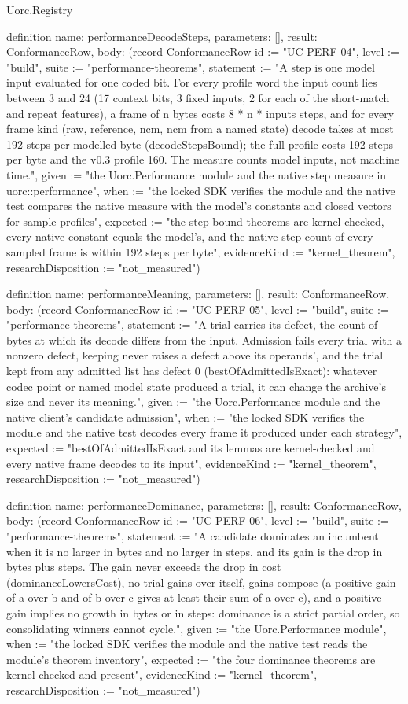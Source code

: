 \begin{lexlean}{Uorc.Registry}
\begin{semanticmodule}
definition{
  name: performanceDecodeSteps,
  parameters: [],
  result: ConformanceRow,
  body: (record ConformanceRow {id := "UC-PERF-04", level := "build", suite := "performance-theorems", statement := "A step is one model input evaluated for one coded bit. For every profile word the input count lies between 3 and 24 (17 context bits, 3 fixed inputs, 2 for each of the short-match and repeat features), a frame of n bytes costs 8 * n * inputs steps, and for every frame kind (raw, reference, ncm, ncm from a named state) decode takes at most 192 steps per modelled byte (decodeStepsBound); the full profile costs 192 steps per byte and the v0.3 profile 160. The measure counts model inputs, not machine time.", given := "the Uorc.Performance module and the native step measure in uorc::performance", when := "the locked SDK verifies the module and the native test compares the native measure with the model's constants and closed vectors for sample profiles", expected := "the step bound theorems are kernel-checked, every native constant equals the model's, and the native step count of every sampled frame is within 192 steps per byte", evidenceKind := "kernel_theorem", researchDisposition := "not_measured"})
}

definition{
  name: performanceMeaning,
  parameters: [],
  result: ConformanceRow,
  body: (record ConformanceRow {id := "UC-PERF-05", level := "build", suite := "performance-theorems", statement := "A trial carries its defect, the count of bytes at which its decode differs from the input. Admission fails every trial with a nonzero defect, keeping never raises a defect above its operands', and the trial kept from any admitted list has defect 0 (bestOfAdmittedIsExact): whatever codec point or named model state produced a trial, it can change the archive's size and never its meaning.", given := "the Uorc.Performance module and the native client's candidate admission", when := "the locked SDK verifies the module and the native test decodes every frame it produced under each strategy", expected := "bestOfAdmittedIsExact and its lemmas are kernel-checked and every native frame decodes to its input", evidenceKind := "kernel_theorem", researchDisposition := "not_measured"})
}

definition{
  name: performanceDominance,
  parameters: [],
  result: ConformanceRow,
  body: (record ConformanceRow {id := "UC-PERF-06", level := "build", suite := "performance-theorems", statement := "A candidate dominates an incumbent when it is no larger in bytes and no larger in steps, and its gain is the drop in bytes plus steps. The gain never exceeds the drop in cost (dominanceLowersCost), no trial gains over itself, gains compose (a positive gain of a over b and of b over c gives at least their sum of a over c), and a positive gain implies no growth in bytes or in steps: dominance is a strict partial order, so consolidating winners cannot cycle.", given := "the Uorc.Performance module", when := "the locked SDK verifies the module and the native test reads the module's theorem inventory", expected := "the four dominance theorems are kernel-checked and present", evidenceKind := "kernel_theorem", researchDisposition := "not_measured"})
}


\end{semanticmodule}
\end{lexlean}

